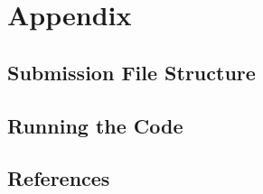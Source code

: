 \section{Appendix}
\subsection{Submission File Structure}
\subsection{Running the Code}
\subsection{References}
\printbibliography[heading=none]
